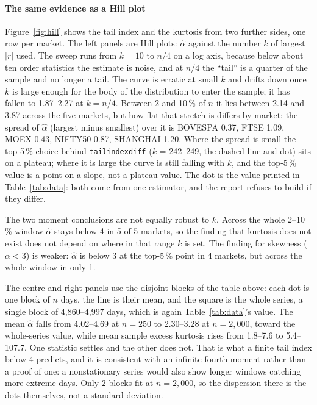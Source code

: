 \documentclass[11pt,a4paper]{article}
\makeatletter
\DeclareRobustCommand{\_}{\ifmmode\nfss@text{\textunderscore}\else\textunderscore\allowbreak\fi}
\makeatother
\begin{document}
\paragraph{The same evidence as a Hill plot} Figure~\ref{fig:hill} shows the tail index and the kurtosis from two further sides, one row per market. The left panels are Hill plots: $\hat\alpha$ against the number $k$ of largest $|r|$ used. The sweep runs from $k=10$ to $n/4$ on a log axis, because below about ten order statistics the estimate is noise, and at $n/4$ the ``tail'' is a quarter of the sample and no longer a tail. The curve is erratic at small $k$ and drifts down once $k$ is large enough for the body of the distribution to enter the sample; it has fallen to 1.87--2.27 at $k=n/4$. Between 2 and 10\,\% of $n$ it lies between 2.14 and 3.87 across the five markets, but how flat that stretch is differs by market: the spread of $\hat\alpha$ (largest minus smallest) over it is BOVESPA 0.37, FTSE 1.09, MOEX 0.43, NIFTY50 0.87, SHANGHAI 1.20. Where the spread is small the top-5\,\% choice behind \texttt{tail\_index\_diff} ($k$ = 242--249, the dashed line and dot) sits on a plateau; where it is large the curve is still falling with $k$, and the top-5\,\% value is a point on a slope, not a plateau value. The dot is the value printed in Table~\ref{tab:data}: both come from one estimator, and the report refuses to build if they differ.

The two moment conclusions are not equally robust to $k$. Across the whole 2--10\,\% window $\hat\alpha$ stays below 4 in 5 of 5 markets, so the finding that kurtosis does not exist does not depend on where in that range $k$ is set. The finding for skewness ($\alpha<3$) is weaker: $\hat\alpha$ is below 3 at the top-5\,\% point in 4 markets, but across the whole window in only 1.

The centre and right panels use the disjoint blocks of the table above: each dot is one block of $n$ days, the line is their mean, and the square is the whole series, a single block of 4,860--4,997 days, which is again Table~\ref{tab:data}'s value. The mean $\hat\alpha$ falls from 4.02--4.69 at $n=250$ to 2.30--3.28 at $n=2{,}000$, toward the whole-series value, while mean sample excess kurtosis rises from 1.8--7.6 to 5.4--107.7. One statistic settles and the other does not. That is what a finite tail index below 4 predicts, and it is consistent with an infinite fourth moment rather than a proof of one: a nonstationary series would also show longer windows catching more extreme days. Only 2 blocks fit at $n=2{,}000$, so the dispersion there is the dots themselves, not a standard deviation.
\end{document}
